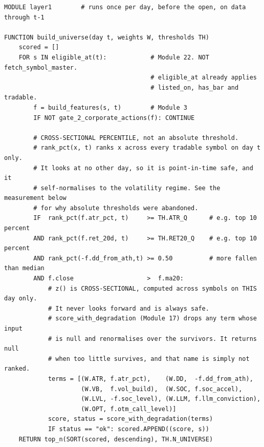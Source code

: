 \documentclass[10pt]{article}
\begin{document}
\begin{lstlisting}
MODULE layer1        # runs once per day, before the open, on data through t-1

FUNCTION build_universe(day t, weights W, thresholds TH)
    scored = []
    FOR s IN eligible_at(t):            # Module 22. NOT fetch_symbol_master.
                                        # eligible_at already applies
                                        # listed_on, has_bar and tradable.
        f = build_features(s, t)        # Module 3
        IF NOT gate_2_corporate_actions(f): CONTINUE

        # CROSS-SECTIONAL PERCENTILE, not an absolute threshold.
        # rank_pct(x, t) ranks x across every tradable symbol on day t only.
        # It looks at no other day, so it is point-in-time safe, and it
        # self-normalises to the volatility regime. See the measurement below
        # for why absolute thresholds were abandoned.
        IF  rank_pct(f.atr_pct, t)     >= TH.ATR_Q      # e.g. top 10 percent
        AND rank_pct(f.ret_20d, t)     >= TH.RET20_Q    # e.g. top 10 percent
        AND rank_pct(-f.dd_from_ath,t) >= 0.50          # more fallen than median
        AND f.close                    >  f.ma20:
            # z() is CROSS-SECTIONAL, computed across symbols on THIS day only.
            # It never looks forward and is always safe.
            # score_with_degradation (Module 17) drops any term whose input
            # is null and renormalises over the survivors. It returns null
            # when too little survives, and that name is simply not ranked.
            terms = [(W.ATR, f.atr_pct),    (W.DD,  -f.dd_from_ath),
                     (W.VB,  f.vol_build),  (W.SOC, f.soc_accel),
                     (W.LVL, -f.soc_level), (W.LLM, f.llm_conviction),
                     (W.OPT, f.otm_call_level)]
            score, status = score_with_degradation(terms)
            IF status == "ok": scored.APPEND((score, s))
    RETURN top_n(SORT(scored, descending), TH.N_UNIVERSE)


\end{lstlisting}
\end{document}
